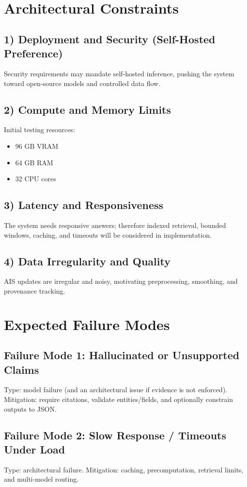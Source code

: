 \documentclass[11pt]{article}
\begin{document}
\section{Architectural Constraints}
\subsection*{1) Deployment and Security (Self-Hosted Preference)}
Security requirements may mandate self-hosted inference, pushing the system toward open-source models and controlled data flow.

\subsection*{2) Compute and Memory Limits}
Initial testing resources:
\begin{itemize}
  \item 96 GB VRAM
  \item 64 GB RAM
  \item 32 CPU cores
\end{itemize}

\subsection*{3) Latency and Responsiveness}
The system needs responsive answers; therefore indexed retrieval, bounded windows, caching, and timeouts will be considered in implementation.

\subsection*{4) Data Irregularity and Quality}
AIS updates are irregular and noisy, motivating preprocessing, smoothing, and provenance tracking.

\section{Expected Failure Modes}
\subsection*{Failure Mode 1: Hallucinated or Unsupported Claims}
Type: model failure (and an architectural issue if evidence is not enforced). Mitigation: require citations, validate entities/fields, and optionally constrain outputs to JSON.

\subsection*{Failure Mode 2: Slow Response / Timeouts Under Load}
Type: architectural failure. Mitigation: caching, precomputation, retrieval limits, and multi-model routing.
\end{document}
